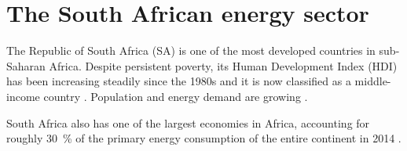 \chapter{The South African energy sector}
The Republic of South Africa (SA) is one of the most developed countries in sub-Saharan Africa. Despite persistent poverty, its Human Development Index (HDI) has been increasing steadily since the 1980s and it is now classified as a middle-income country \cite{UNDP2014}. Population and energy demand are growing \cite{TheWorldBank2015,Agency2015}.

South Africa also has one of the largest economies in Africa, accounting for roughly \SI{30}{\percent} of the primary energy consumption of the entire continent in 2014 \cite{BP2015b}.

